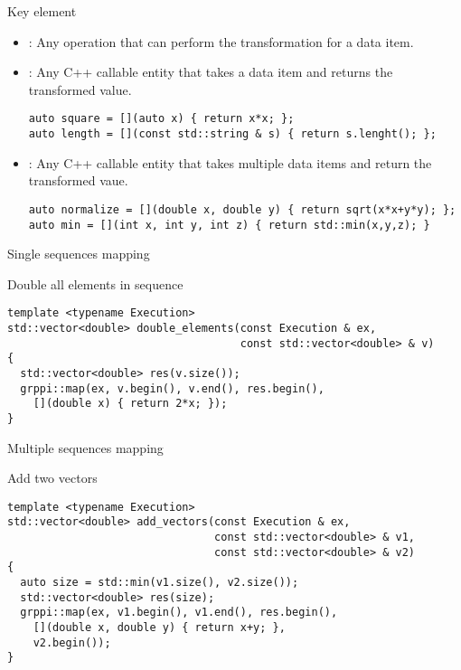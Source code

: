 \begin{frame}[t,fragile]{Key element}
\begin{itemize}
  \item {}: Any operation that can perform the
        transformation for a data item.

  \vfill\pause
  \item {}: Any C++ callable entity that takes a data
        item and returns the transformed value.
\begin{lstlisting}
auto square = [](auto x) { return x*x; };
auto length = [](const std::string & s) { return s.lenght(); };
\end{lstlisting}

  \vfill\pause
  \item {}: Any C++ callable entity that takes multiple
        data items and return the transformed vaue.
\begin{lstlisting}
auto normalize = [](double x, double y) { return sqrt(x*x+y*y); };
auto min = [](int x, int y, int z) { return std::min(x,y,z); }
\end{lstlisting}
\end{itemize}
\end{frame}

\begin{frame}[t,fragile]{Single sequences mapping}
\begin{block}{Double all elements in sequence}
\begin{lstlisting}
template <typename Execution>
std::vector<double> double_elements(const Execution & ex, 
                                    const std::vector<double> & v) 
{
  std::vector<double> res(v.size());
  grppi::map(ex, v.begin(), v.end(), res.begin(), 
    [](double x) { return 2*x; });
}
\end{lstlisting}
\end{block}
\end{frame}

\begin{frame}[t,fragile]{Multiple sequences mapping}
\begin{block}{Add two vectors}
\begin{lstlisting}
template <typename Execution>
std::vector<double> add_vectors(const Execution & ex, 
                                const std::vector<double> & v1,
                                const std::vector<double> & v2) 
{
  auto size = std::min(v1.size(), v2.size());
  std::vector<double> res(size);
  grppi::map(ex, v1.begin(), v1.end(), res.begin(),
    [](double x, double y) { return x+y; },
    v2.begin());
}
\end{lstlisting}
\end{block}
\end{frame}

